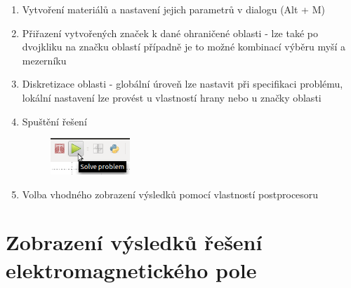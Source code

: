 \begin{enumerate}
\item Vytvoření materiálů a nastavení jejich parametrů v dialogu  (Alt + M)
\item Přiřazení vytvořených značek k dané ohraničené oblasti - lze také po dvojkliku na značku oblastí případně je to možné kombinací výběru myší a mezerníku
\item Diskretizace oblasti - globální úroveň lze nastavit při specifikaci problému, lokální nastavení lze provést u vlastností hrany nebo u značky oblasti 
\item Spuštění řešení
\begin{figure}[!h]
	\centering
	\includegraphics[width=3cm]{sim_spusteni_reseni.png}
\end{figure}
\item Volba vhodného zobrazení výsledků pomocí vlastností postprocesoru
\end{enumerate}

\section{Zobrazení výsledků řešení elektromagnetického pole}


